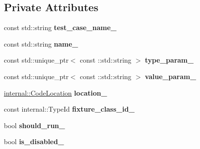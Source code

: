 \subsection*{Private Attributes}
\begin{DoxyCompactItemize}
\item 
\mbox{\label{classtesting_1_1_test_info_a3dcf626bbfc3756103be329c05377a5f}} 
const std\+::string {\bfseries test\+\_\+case\+\_\+name\+\_\+}
\item 
\mbox{\label{classtesting_1_1_test_info_a6bed52b7c3d66c8c5eac5fa2aaadba55}} 
const std\+::string {\bfseries name\+\_\+}
\item 
\mbox{\label{classtesting_1_1_test_info_a6c6d79e6238f2af5093e2c419480b433}} 
const std\+::unique\+\_\+ptr$<$ const \+::std\+::string $>$ {\bfseries type\+\_\+param\+\_\+}
\item 
\mbox{\label{classtesting_1_1_test_info_adf2e7579cf713f7b2df1d542ca2ab9ff}} 
const std\+::unique\+\_\+ptr$<$ const \+::std\+::string $>$ {\bfseries value\+\_\+param\+\_\+}
\item 
\mbox{\label{classtesting_1_1_test_info_a749494420174e6cf1949c7b411e8df6f}} 
\mbox{\hyperlink{structtesting_1_1internal_1_1_code_location}{internal\+::\+Code\+Location}} {\bfseries location\+\_\+}
\item 
\mbox{\label{classtesting_1_1_test_info_ad3284b7b9ebe61cc31440694091450ae}} 
const internal\+::\+Type\+Id {\bfseries fixture\+\_\+class\+\_\+id\+\_\+}
\item 
\mbox{\label{classtesting_1_1_test_info_a89c3d8fb8b565532c34d3123240fd5cf}} 
bool {\bfseries should\+\_\+run\+\_\+}
\item 
\mbox{\label{classtesting_1_1_test_info_af3765fc4f811296e0699b0a26430a7c7}} 
bool {\bfseries is\+\_\+disabled\+\_\+}
\item 
\mbox{\label{classtesting_1_1_test_info_a397686f82b6dd68a209ab7b50eeb4932}} 

\end{DoxyCompactItemize}
